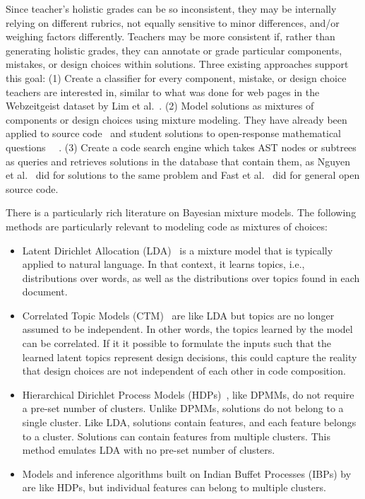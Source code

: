 Since teacher's holistic grades can be so inconsistent, they may be internally relying on different rubrics, not equally sensitive to minor differences, and/or weighing factors differently. Teachers may be more consistent if, rather than generating holistic grades, they can annotate or grade particular components, mistakes, or design choices within solutions. Three existing approaches support this goal: (1) Create a classifier for every component, mistake, or design choice teachers are interested in, similar to what was done for web pages in the Webzeitgeist dataset by Lim et al.~\cite{lim2012learning}. (2) Model solutions as mixtures of components or design choices using mixture modeling. They have already been applied to source code~\cite{} and student solutions to open-response mathematical questions~\cite{} ~\cite{binkley2014understanding,Linstead}. (3) Create a code search engine which takes AST nodes or subtrees as queries and retrieves solutions in the database that contain them, as Nguyen et al.~\cite{codewebs} did for solutions to the same problem and Fast et al.~\cite{codex} did for general open source code.

There is a particularly rich literature on Bayesian mixture models. The following methods are particularly relevant to modeling code as mixtures of choices:
\begin{itemize}
\item Latent Dirichlet Allocation (LDA)~\cite{bleiLDA} is a mixture model that is typically applied to natural language. In that context, it learns topics, i.e., distributions over words, as well as the distributions over topics found in each document. %
\item Correlated Topic Models (CTM)~\cite{} are like LDA but topics are no longer assumed to be independent. In other words, the topics learned by the model can be correlated. If it it possible to formulate the inputs such that the learned latent topics represent design decisions, this could capture the reality that design choices are not independent of each other in code composition.
\item Hierarchical Dirichlet Process Models (HDPs)~\cite{}, like DPMMs, do not require a pre-set number of clusters. Unlike DPMMs, solutions do not belong to a single cluster. Like LDA, solutions contain features, and each feature belongs to a cluster. Solutions can contain features from multiple clusters. This method emulates LDA with no pre-set number of clusters. 
\item Models and inference algorithms built on Indian Buffet Processes (IBPs) by \citet{doshi2009indian} are like HDPs, but individual features can belong to multiple clusters.
\end{itemize}


